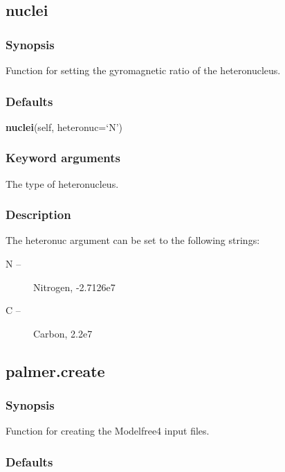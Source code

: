 \newpage

\subsection{nuclei}


\subsubsection{Synopsis}

Function for setting the gyromagnetic ratio of the heteronucleus.

\subsubsection{Defaults}

\textsf{\textbf{nuclei}(self, heteronuc=`N')}


\subsubsection{Keyword arguments}


  The type of heteronucleus.

\subsubsection{Description}

The heteronuc argument can be set to the following strings:

\begin{description}
\item[    N --]   Nitrogen, -2.7126e7
\item[    C --]   Carbon, 2.2e7
\end{description}


\newpage

\subsection{palmer.create}


\subsubsection{Synopsis}

Function for creating the Modelfree4 input files.

\subsubsection{Defaults}

